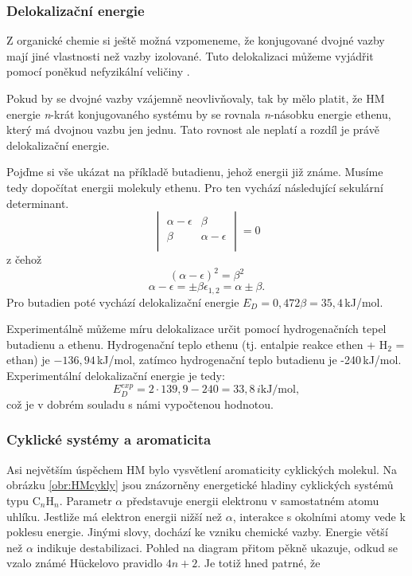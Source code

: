 \subsubsection{Delokalizační energie}

Z organické chemie si ještě možná vzpomeneme, že konjugované dvojné vazby mají jiné vlastnosti než vazby izolované.
Tuto delokalizaci můžeme vyjádřit pomocí poněkud nefyzikální veličiny .

Pokud by se dvojné vazby vzájemně neovlivňovaly, tak by mělo platit, že HM energie
\textit{n}-krát konjugovaného systému by se rovnala \textit{n}-násobku energie ethenu, který má dvojnou vazbu jen jednu. Tato rovnost ale neplatí a rozdíl je právě delokalizační energie. 

Pojďme si vše ukázat na příkladě butadienu, jehož energii již známe. Musíme tedy dopočítat energii molekuly ethenu. Pro ten vychází následující sekulární determinant. 
\begin{equation}
\begin{vmatrix}
\alpha - \epsilon & \beta \\
\beta & \alpha - \epsilon \\
\end{vmatrix}
=0
\end{equation}
z čehož
$$
(\alpha-\epsilon)^2=\beta^2
$$
$$
\alpha - \epsilon = \pm \beta
\epsilon_{1,2}= \alpha\pm \beta .
$$
Pro butadien poté vychází delokalizační energie $E_D = 0,472\beta=35,4$\,kJ/mol.

Experimentálně můžeme míru delokalizace určit pomocí hydrogenačních tepel butadienu a ethenu.
Hydrogenační teplo ethenu (tj. entalpie reakce ethen + H$_2$ = ethan) je $-136,94$\,kJ/mol, zatímco hydrogenační teplo butadienu je -240\,kJ/mol. Experimentální delokalizační energie je tedy:
$$
E_D^{exp}=2\cdot139,9-240 = 33,8\,i\mathrm{kJ/mol},
$$
což je v dobrém souladu s námi vypočtenou hodnotou.

\subsubsection{Cyklické systémy a aromaticita}

Asi největším úspěchem HM bylo vysvětlení aromaticity cyklických molekul. Na obrázku \ref{obr:HMcykly} jsou znázorněny energetické hladiny cyklických systémů typu C$_n$H$_n$. Parametr $\alpha$ představuje energii elektronu v samostatném atomu uhlíku. Jestliže má elektron energii nižší než  $\alpha$, interakce s okolními atomy vede k poklesu energie. Jinými slovy, dochází ke vzniku chemické vazby. Energie větší než $\alpha$ indikuje destabilizaci. Pohled na diagram přitom pěkně ukazuje, odkud se vzalo známé  H\"{u}ckelovo pravidlo $4n+2$. Je totiž hned patrné, že

